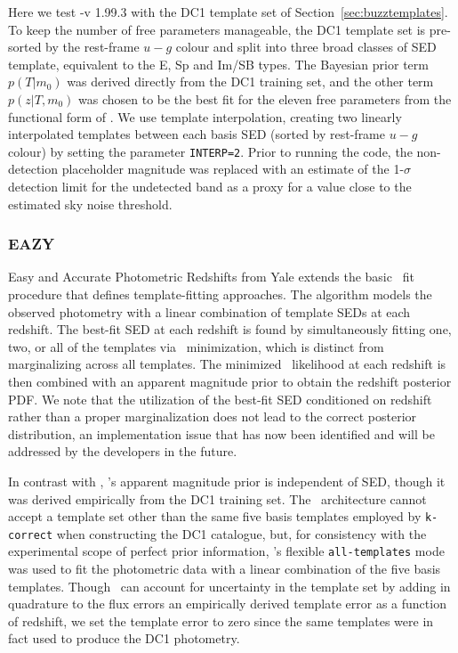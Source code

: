 Here we test \bpz-v 1.99.3 \citep{Benitez:00} with the DC1 template set of Section~\ref{sec:buzztemplates}.
To keep the number of free parameters manageable, the DC1 template set is pre-sorted by the rest-frame $u-g$ colour and split into three broad classes of SED template, equivalent to the E, Sp and Im/SB types.
The Bayesian prior term $p(T \vert m_{0})$ was derived directly from the DC1 training set, and the other term $p(z \vert T, m_{0})$ was chosen to be the best fit for the eleven free parameters from the functional form of \citet{Benitez:00}.
We use template interpolation, creating two linearly interpolated templates between each basis SED (sorted by rest-frame $u-g$ colour) by setting the parameter \texttt{INTERP=2}.
Prior to running the code, the non-detection placeholder magnitude was replaced with an estimate of the 1-$\sigma$ detection limit for the undetected band as a proxy for a value close to the estimated sky noise threshold.

\subsubsection{EAZY}
\label{sec:eazy}

Easy and Accurate Photometric Redshifts from Yale \citep[\eazy,][]{Brammer:08} extends the basic \chisq\ fit procedure that defines template-fitting approaches.
The algorithm models the observed photometry with a linear combination of template SEDs at each redshift.
The best-fit SED at each redshift is found by simultaneously fitting one, two, or all of the templates via \chisq\ minimization, which is distinct from marginalizing across all templates.
The minimized \chisq\ likelihood at each redshift is then combined with an apparent magnitude prior to obtain the redshift posterior PDF.
We note that the utilization of the best-fit SED conditioned on redshift rather than a proper marginalization does not lead to the correct posterior distribution, an implementation issue that has now been identified and will be addressed by the developers in the future.

In contrast with \bpz, \eazy's apparent magnitude prior is independent of SED, though it was derived empirically from the DC1 training set.
The \eazy\ architecture cannot accept a template set other than the same five basis templates employed by \texttt{k-correct} when constructing the DC1 catalogue, but, for consistency with the experimental scope of perfect prior information, \eazy's flexible \texttt{all-templates} mode was used to fit the photometric data with a linear combination of the five basis templates.
Though \eazy\ can account for uncertainty in the template set by adding in quadrature to the flux errors an empirically derived template error as a function of redshift, we set the template error to zero since the same templates were in fact used to produce the DC1 photometry.

